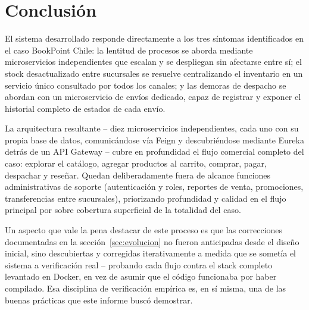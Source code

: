 \chapter{Conclusión}

El sistema desarrollado responde directamente a los tres síntomas identificados en el
caso BookPoint Chile: la lentitud de procesos se aborda mediante microservicios
independientes que escalan y se despliegan sin afectarse entre sí; el stock
desactualizado entre sucursales se resuelve centralizando el inventario en un servicio
único consultado por todos los canales; y las demoras de despacho se abordan con un
microservicio de envíos dedicado, capaz de registrar y exponer el historial completo de
estados de cada envío.

La arquitectura resultante -- diez microservicios independientes, cada uno con su
propia base de datos, comunicándose vía Feign y descubriéndose mediante Eureka detrás de
un API Gateway -- cubre en profundidad el flujo comercial completo del caso: explorar el
catálogo, agregar productos al carrito, comprar, pagar, despachar y reseñar. Quedan
deliberadamente fuera de alcance funciones administrativas de soporte (autenticación y
roles, reportes de venta, promociones, transferencias entre sucursales), priorizando
profundidad y calidad en el flujo principal por sobre cobertura superficial de la
totalidad del caso.

Un aspecto que vale la pena destacar de este proceso es que las correcciones
documentadas en la sección~\ref{sec:evolucion} no fueron anticipadas desde el diseño
inicial, sino descubiertas y corregidas iterativamente a medida que se sometía el
sistema a verificación real -- probando cada flujo contra el stack completo levantado
en Docker, en vez de asumir que el código funcionaba por haber compilado. Esa disciplina
de verificación empírica es, en sí misma, una de las buenas prácticas que este informe
buscó demostrar.

